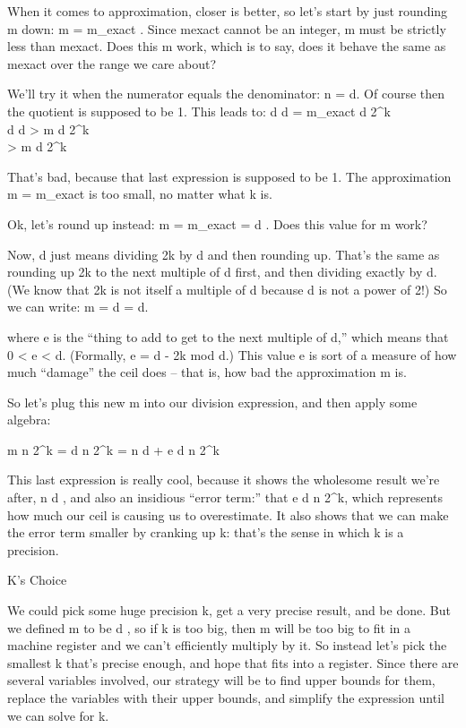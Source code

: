 When it comes to approximation, closer is better, so let’s start by just rounding m down: m = \lfloor m_{exact} \rfloor. Since mexact cannot be an integer, m must be strictly less than mexact. Does this m work, which is to say, does it behave the same as mexact over the range we care about?

We’ll try it when the numerator equals the denominator: n = d. Of course then the quotient is supposed to be 1. This leads to:
\frac d d = m_{exact} \times \frac d {2^k} \\ \implies \frac d d > m \times \frac d {2^k} \\  > \lfloor m \times \frac d {2^k} \rfloor

That’s bad, because that last expression is supposed to be 1. The approximation m = \lfloor m_{exact} \rfloor is too small, no matter what k is.

Ok, let’s round up instead: m = \lceil m_{exact} \rceil = \lceil {} d \rceil. Does this value for m work?

Now, \lceil {} d \rceil just means dividing 2k by d and then rounding up. That’s the same as rounding up 2k to the next multiple of d first, and then dividing exactly by d. (We know that 2k is not itself a multiple of d because d is not a power of 2!) So we can write:
m = \lceil {} d \rceil =  d.

where e is the “thing to add to get to the next multiple of d,” which means that 0 < e < d. (Formally, e = d - 2k mod d.) This value e is sort of a measure of how much “damage” the ceil does – that is, how bad the approximation m is.

So let’s plug this new m into our division expression, and then apply some algebra:

\lfloor m \times \frac n {2^k} \rfloor = \lfloor {} d \times \frac n {2^k} \rfloor = \lfloor \frac n d + \frac e d \times \frac n {2^k} \rfloor

This last expression is really cool, because it shows the wholesome result we’re after, \lfloor \frac n d \rfloor, and also an insidious “error term:” that \frac e d \times \frac n {2^k}, which represents how much our ceil is causing us to overestimate. It also shows that we can make the error term smaller by cranking up k: that’s the sense in which k is a precision.
 
K’s Choice

We could pick some huge precision k, get a very precise result, and be done. But we defined m to be \lceil {} d \rceil, so if k is too big, then m will be too big to fit in a machine register and we can’t efficiently multiply by it. So instead let’s pick the smallest k that’s precise enough, and hope that fits into a register. Since there are several variables involved, our strategy will be to find upper bounds for them, replace the variables with their upper bounds, and simplify the expression until we can solve for k.

